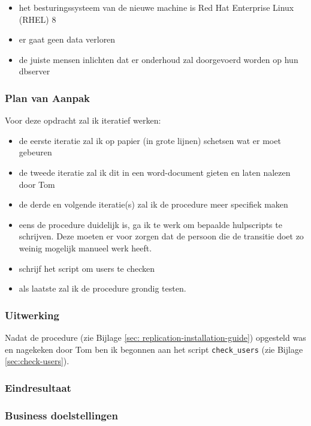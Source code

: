 \begin{itemize}
    \item het besturingssysteem van de nieuwe machine is Red Hat Enterprise Linux (RHEL) 8
    \item er gaat geen data verloren
    \item de juiste mensen inlichten dat er onderhoud zal doorgevoerd worden op hun dbserver
\end{itemize}

\subsubsection{Plan van Aanpak}

Voor deze opdracht zal ik iteratief werken:

\begin{itemize}
    \item de eerste iteratie zal ik op papier (in grote lijnen) schetsen wat er moet gebeuren
    \item de tweede iteratie zal ik dit in een word-document gieten en laten nalezen door Tom
    \item de derde en volgende iteratie(s) zal ik de procedure meer specifiek maken
    \item eens de procedure duidelijk is, ga ik te werk om bepaalde hulpscripts te schrijven. Deze moeten er voor zorgen dat de persoon die de transitie doet zo weinig mogelijk manueel werk heeft.
    \item schrijf het script om users te checken
    \item als laatste zal ik de procedure grondig testen.
\end{itemize}

\subsubsection{Uitwerking}

Nadat de procedure (zie Bijlage \ref{sec: replication-installation-guide}) opgesteld was en nagekeken door Tom ben ik begonnen aan het script \verb*|check_users| (zie Bijlage \ref{sec:check-users}).

\subsubsection{Eindresultaat}
\subsubsection{Business doelstellingen}
